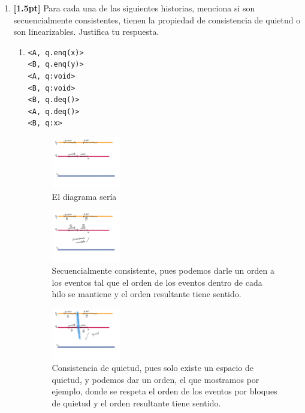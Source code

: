 \documentclass[a4paper,11pt]{article}
\begin{document}
\begin{enumerate}
{\begin{enumerate}
{        }
    \end{enumerate}
    }

    

      \clearpage

      \item{\textbf{[1.5pt]} Para cada una de las siguientes historias, menciona si son 
      secuencialmente consistentes, tienen la propiedad de consistencia de quietud
       o son linearizables. Justifica tu respuesta.
    \begin{enumerate}
        \item {
            \begin{verbatim}
<A, q.enq(x)>
<B, q.enq(y)>
<A, q:void>
<B, q:void>
<B, q.deq()>
<A, q.deq()>
<B, q:x>
            \end{verbatim}

              \begin{figure}[!h]
                \centering
                \includegraphics[width=0.3\textwidth]{Graphics/a}
                \caption{El diagrama sería}
              \end{figure}
  
              
              \begin{figure}[!h]
                \centering
                \includegraphics[width=0.3\textwidth]{Graphics/a_s}
                \caption{Secuencialmente consistente, pues podemos darle un orden a los eventos
                tal que el orden de los eventos dentro de cada hilo se mantiene y el orden
                resultante tiene sentido. }
              \end{figure}
  
              
              \begin{figure}[!h]
                \centering
                \includegraphics[width=0.3\textwidth]{Graphics/a_q}
                \caption{Consistencia de quietud, pues solo existe un espacio de quietud, y podemos
                dar un orden, el que mostramos por ejemplo, donde se respeta el orden de los eventos
                por bloques de quietud y el orden resultante tiene sentido. }
              \end{figure}
  
}
\end{enumerate}}
\end{enumerate}
\end{document}

